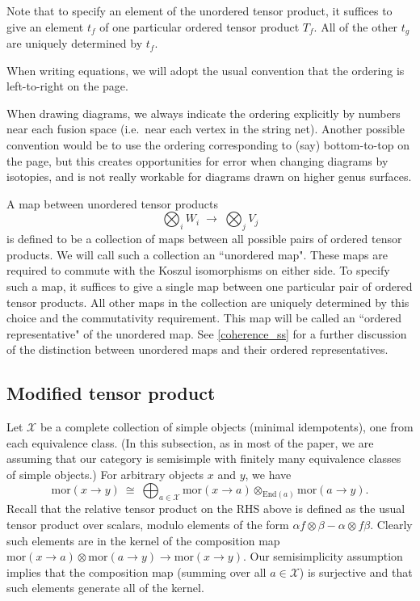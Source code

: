 \documentclass[12pt,a4paper]{article}
\newcommand{\tp}{\otimes}
\newcommand{\mcx}{\mathcal{X}}
\newcommand\be            {\begin{equation}}
\newcommand\ee            {\end{equation}}
\newcommand{\mor}{\text{mor}}
\newcommand{\End}{\text{End}}
\begin{document}
Note that to specify an element of the unordered tensor product, it suffices to give an element $t_f$ of one
particular ordered tensor product $T_f$.
All of the other $t_g$ are uniquely determined by $t_f$.

When writing equations, we will adopt the usual convention that the ordering is left-to-right on the page.

When drawing diagrams, we always indicate the ordering explicitly by numbers near each fusion space (i.e.\ near
each vertex in the string net).
Another possible convention would be to use the ordering corresponding to (say) bottom-to-top on the page,
but this creates opportunities for error when changing diagrams by isotopies,
and is not really workable for diagrams drawn on higher genus surfaces.

A map between unordered tensor products
\be
	\bigotimes_i W_i \; \to \; \bigotimes_j V_j
\ee
is defined to be a collection of maps between
all possible pairs of ordered tensor products.
We will call such a collection an ``unordered map".
These maps are required to commute with the Koszul isomorphisms on either side.
To specify such a map, it suffices to give a single map between one particular pair of ordered tensor products.
All other maps in the collection are uniquely determined by this choice and the commutativity requirement.
This map will be called an ``ordered representative" of the unordered map.
See \ref{coherence_ss} for a further discussion of the distinction between unordered maps and
their ordered representatives.





\subsection{Modified tensor product} \label{modified_tensor_product}

Let $\mcx$ be a complete collection of simple objects (minimal idempotents), one from each equivalence class.
(In this subsection, as in most of the paper, we are assuming that our category is semisimple with finitely many equivalence
classes of simple objects.)
For arbitrary objects $x$ and $y$, we have
\be \label{sobdecomp}
	\mor(x\to y) \: \cong \: \bigoplus_{a\in\mcx} \mor(x\to a) \tp_{\End(a)} \mor(a\to y) .
\ee
Recall that the relative tensor product on the RHS above is defined as the usual tensor product over scalars, modulo elements
of the form $\alpha f \tp \beta - \alpha\tp f\beta$.
Clearly such elements are in the kernel of the composition map $\mor(x\to a) \tp \mor(a\to y) \to \mor(x\to y)$.
Our semisimplicity assumption implies that the composition map (summing over all $a\in \mcx$) is surjective and that such
elements generate all of the kernel.
\end{document}
